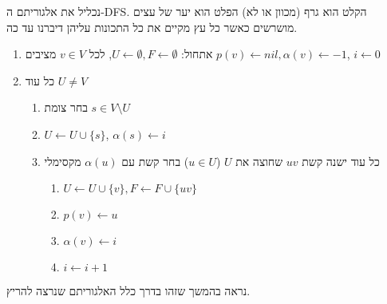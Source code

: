 נכליל את אלגוריתם ה-DFS.
הקלט הוא גרף (מכוון או לא) הפלט הוא יער של עצים מושרשים 
כאשר כל עץ מקיים את כל התכונות עליהן דיברנו עד כה.
\begin{enumerate}
\item
אתחול:
$U \leftarrow \emptyset, F \leftarrow \emptyset$, 
לכל 
$v \in V$
מציבים
$p(v) \leftarrow nil, \alpha(v) \leftarrow -1$,
$i \leftarrow 0$
\item
כל עוד 
$U \neq V$
	\begin{enumerate}
	\item
	בחר צומת 
	$s \in V \setminus U$
	\item
	$U \leftarrow U \cup \{s\}$,
	$\alpha(s) \leftarrow i$

	\item 
	כל עוד ישנה קשת 
	$uv$
	שחוצה את $U$ 
	($u \in U$)
	בחר קשת עם 
	$\alpha(u)$
	מקסימלי
		\begin{enumerate}
		\item
		$U \leftarrow U \cup \{v\}, F \leftarrow F \cup \{uv\}$
		\item
		$p(v) \leftarrow u$
		\item
		$\alpha(v) \leftarrow i$
		\item
		$i \leftarrow i + 1$
		\end{enumerate}
	\end{enumerate}
\end{enumerate}

נראה בהמשך שזהו בדרך כלל האלגוריתם שנרצה להריץ.
